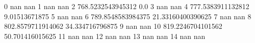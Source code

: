 0 nan nan
1 nan nan
2 768.5232543945312 0.0
3 nan nan
4 777.5383911132812 9.01513671875
5 nan nan
6 789.8548583984375 21.33160400390625
7 nan nan
8 802.8579711914062 34.334716796875
9 nan nan
10 819.2246704101562 50.701416015625
11 nan nan
12 nan nan
13 nan nan
14 nan nan
